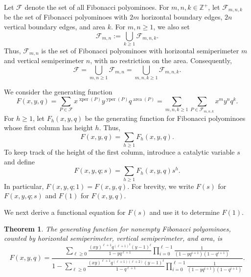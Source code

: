 \documentclass[12pt]{amsart}
\theoremstyle{plain}
\newtheorem{theorem}{Theorem}[section]
\theoremstyle{definition}
\newcommand{\Z}{{\mathbb Z}}
\newcommand{\F}{{\mathcal F}}
\DeclareMathOperator{\yper}{yper}
\DeclareMathOperator{\xper}{xper}
\DeclareMathOperator{\area}{area}
\begin{document}
Let $\F$ denote the set of all Fibonacci polyominoes. For $m,n,k\in\Z^{+}$, let $\F_{m,n,k}$ be the set of
Fibonacci polyominoes with $2m$ horizontal boundary edges, $2n$ vertical boundary edges, and area $k$. For $m,n\geq1$, we also set
\[
\F_{m,n}
:=
\bigcup_{k\geq1}\F_{m,n,k}.
\]
Thus, $\F_{m,n}$ is the set of Fibonacci polyominoes with horizontal semiperimeter $m$ and vertical semiperimeter $n$, with no
restriction on the area. Consequently,
\[
\F
=
\bigcup_{m,n\geq1}\F_{m,n}
=
\bigcup_{m,n,k\geq1}\F_{m,n,k}.
\]

We consider the generating function
\[
F(x,y,q)=\sum_{P\in \F}x^{\xper(P)}y^{\yper(P)}q^{\area(P)}=\sum_{m,n,k\geq 1} \sum_{P\in \F_{m,n,k}}x^{m}y^{n}q^{k}.
\]
For $h\geq 1$, let $F_h(x,y,q)$ be the generating function for Fibonacci polyominoes whose first column has height $h$. Thus,  \[
F(x,y,q)=\sum_{h\geq 1} F_h(x,y,q).
\]
To keep track of the height of the first column, introduce a catalytic variable $s$ and define
\[
F(x,y,q;s)
=
\sum_{h\geq 1}F_h(x,y,q)s^h.
\]
In particular, $F(x,y,q;1)=F(x,y,q)$. For brevity, we write $F(s)$ for $F(x,y,q;s)$ and $F(1)$ for $F(x,y,q)$.

We next derive a functional equation for $F(s)$ and use it to determine $F(1)$.

\begin{theorem}\label{pol:areaper}
The generating function for nonempty Fibonacci polyominoes, counted by horizontal semiperimeter, vertical semiperimeter, and area, is
\[
F(x,y,q)
=
\frac{
\sum_{\ell\geq 0}
\frac{(xy)^{\ell+1}q^{(\ell+1)^2}(y-1)^\ell}
     {1-yq^{\ell+1}}
\prod_{i=0}^{\ell-1}
\frac{1}{(1-yq^{i+1})(1-q^{i+1})}
}{
1-
\sum_{\ell\geq 0}
\frac{(xy)^{\ell+1}q^{(\ell+1)(\ell+2)}(y-1)^\ell}
     {1-q^{\ell+1}}
\prod_{i=0}^{\ell-1}
\frac{1}{(1-yq^{i+1})(1-q^{i+1})}
}.
\]
\end{theorem}
\end{document}
